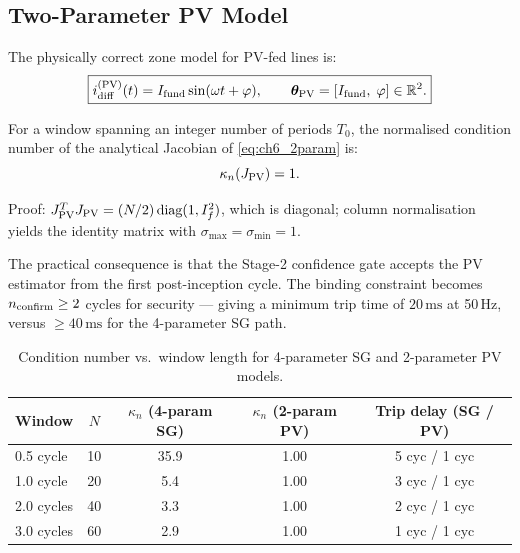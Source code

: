 \subsection{Two-Parameter PV Model}
\label{sec:ch6_pv_model}

The physically correct zone model for PV-fed lines is:
\begin{equation}
  \boxed{i_{\rm diff}^{(\rm PV)}(t) = I_{\rm fund}\sin(\omega t + \varphi), \qquad
  \boldsymbol{\theta}_{\rm PV} = [I_{\rm fund},\;\varphi] \in \mathbb{R}^2.}
  \label{eq:ch6_2param}
\end{equation}

\begin{proposition}
\label{prop:ch6_kappa1}
For a window spanning an integer number of periods $T_0$, the normalised
condition number of the analytical Jacobian of \eqref{eq:ch6_2param} is:
\begin{equation}
  \kappa_n(J_{\rm PV}) = 1.
  \label{eq:ch6_kappa1}
\end{equation}
\end{proposition}
\noindent Proof: $J_{\rm PV}^T J_{\rm PV} = (N/2)\,\text{diag}(1, I_f^2)$, which is diagonal;
column normalisation yields the identity matrix with $\sigma_{\max} = \sigma_{\min} = 1$.

The practical consequence is that the Stage-2 confidence gate accepts the
PV estimator from the first post-inception cycle.  The binding constraint
becomes $n_{\rm confirm} \geq 2$ cycles for security — giving a minimum trip
time of $20\,\text{ms}$ at 50\,Hz, versus $\geq 40\,\text{ms}$ for the
4-parameter SG path.

\begin{table}[h]
  \centering
  \caption{Condition number vs.\ window length for 4-parameter SG and
           2-parameter PV models.}
  \label{tab:ch6_kappa_window}
  \begin{tabular}{lcccc}
    \toprule
    Window & $N$ & $\kappa_n$ (4-param SG) & $\kappa_n$ (2-param PV) & Trip delay (SG / PV) \\
    \midrule
    0.5 cycle &  10 & 35.9 & 1.00 & 5 cyc / 1 cyc \\
    1.0 cycle &  20 &  5.4 & 1.00 & 3 cyc / 1 cyc \\
    2.0 cycles & 40 &  3.3 & 1.00 & 2 cyc / 1 cyc \\
    3.0 cycles & 60 &  2.9 & 1.00 & 1 cyc / 1 cyc \\
    \bottomrule
  \end{tabular}
\end{table}

